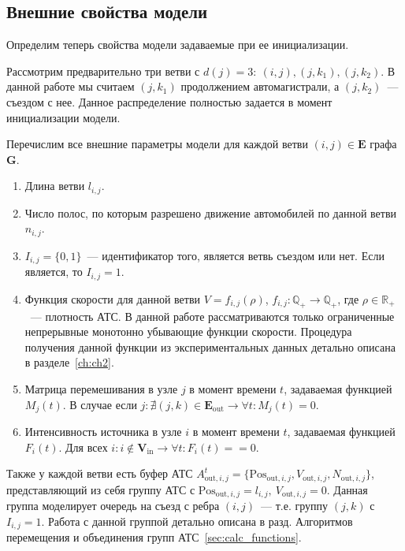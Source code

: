 \subsection{Внешние свойства модели}
\label{sec:graph_structure}
Определим теперь свойства модели задаваемые при ее инициализации.

Рассмотрим предварительно три ветви с \(d(j) = 3:\ (i, j), (j, k_1), (j, k_2)\).
В данной работе мы считаем \((j, k_1)\) продолжением автомагистрали, а \((j, k_2)\)~--- съездом с нее. Данное распределение полностью задается в момент инициализации модели.

Перечислим все внешние параметры модели для каждой ветви \((i, j) \in \mathbf{E}\) графа \(\mathbf{G}\).
\begin{enumerate}
    \item Длина ветви \(l_{i, j}\).
    \item Число полос, по которым разрешено движение автомобилей по данной ветви \(n_{i, j}\).
    \item \(I_{i, j} = \{0, 1\}\)~--- идентификатор того, является ветвь съездом или нет. Если является, то \(I_{i, j} = 1\).
    \item Функция скорости для данной ветви \(V = f_{i,j}(\rho)\), \(f_{i,j}: \mathbb{Q}_+ \rightarrow \mathbb{Q}_+\), где \(\rho\in\mathbb{R}_+\)~--- плотность АТС.
        В данной работе рассматриваются только ограниченные непрерывные монотонно убывающие функции скорости.
        Процедура получения данной функции из экспериментальных данных детально описана в разделе~\ref{ch:ch2}.
    \item Матрица перемешивания в узле \(j\) в момент времени \(t\), задаваемая функцией \(M_j(t)\).
        В случае если \(j: \nexists (j,k) \in \mathbf{E}_\text{out} \rightarrow \forall t: M_j(t) = 0\).
    \item Интенсивность источника в узле \(i\) в момент времени \(t\), задаваемая функцией \(F_i(t)\). Для всех \(i: i\notin \mathbf{V}_\text{in} \rightarrow \forall t: F_i(t) == 0\).
\end{enumerate}

Также у каждой ветви есть буфер АТС \(A^t_{\text{out}, i, j} = \{\mathrm{Pos}_{\text{out}, i, j}, V_{\text{out}, i, j}, N_{\text{out}, i, j}\}\), представляющий из себя группу АТС с \(\mathrm{Pos}_{\text{out}, i, j} = l_{i, j},\ V_{\text{out}, i, j} = 0\).
Данная группа моделирует очередь на съезд с ребра \((i, j)\)~--- т.е. группу \((j, k)\) с \(I_{i, j} = 1\).
Работа с данной группой детально описана в разд.
Алгоритмов перемещения и объединения групп АТС~\ref{sec:calc_functions}.

